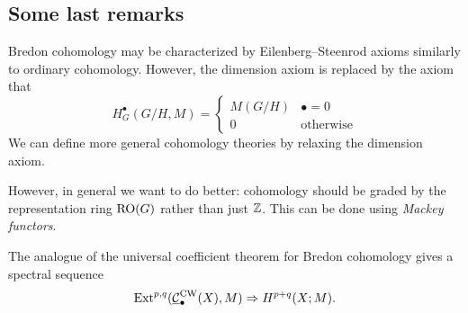 \documentclass{article}
\begin{document}
\subsection{Some last remarks}

Bredon cohomology may be characterized by Eilenberg--Steenrod axioms similarly to ordinary cohomology.
However, the dimension axiom is replaced by the axiom that 
\[
  H^\bullet_G(G/H, M) = \begin{cases}
    M(G/H) & \textrm{$\bullet = 0$} \\
    0 & \textrm{otherwise}
  \end{cases}
\]
We can define more general cohomology theories by relaxing the dimension axiom.

However, in general we want to do better: cohomology should be graded by the representation ring $\operatorname{RO}(G)$ rather than just $\mathbb{Z}$.
This can be done using \emph{Mackey functors}.

The analogue of the universal coefficient theorem for Bredon cohomology gives a spectral sequence
\[
  \operatorname{Ext}^{p,q}(\underline{\mathcal{C}}_\bullet^{\textrm{CW}}(X), M) \Rightarrow H^{p+q}(X; M).
\]
\end{document}
